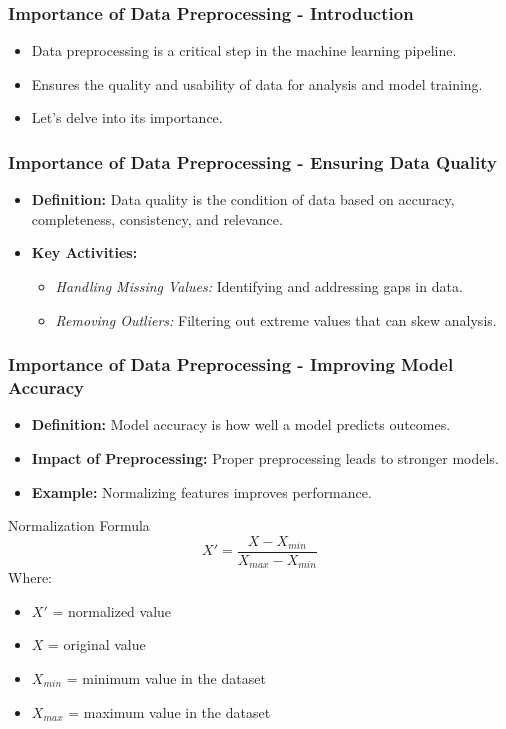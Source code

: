 \documentclass{beamer}
\begin{document}
\begin{frame}[fragile]
    \frametitle{Importance of Data Preprocessing - Introduction}
    \begin{itemize}
        \item Data preprocessing is a critical step in the machine learning pipeline.
        \item Ensures the quality and usability of data for analysis and model training.
        \item Let's delve into its importance.
    \end{itemize}
\end{frame}

\begin{frame}[fragile]
    \frametitle{Importance of Data Preprocessing - Ensuring Data Quality}
    \begin{itemize}
        \item \textbf{Definition:} Data quality is the condition of data based on accuracy, completeness, consistency, and relevance.
        \item \textbf{Key Activities:}
        \begin{itemize}
            \item \textit{Handling Missing Values:} Identifying and addressing gaps in data.
            \item \textit{Removing Outliers:} Filtering out extreme values that can skew analysis.
        \end{itemize}
    \end{itemize}
\end{frame}

\begin{frame}[fragile]
    \frametitle{Importance of Data Preprocessing - Improving Model Accuracy}
    \begin{itemize}
        \item \textbf{Definition:} Model accuracy is how well a model predicts outcomes.
        \item \textbf{Impact of Preprocessing:} Proper preprocessing leads to stronger models.
        \item \textbf{Example:} Normalizing features improves performance.
    \end{itemize}
    \begin{block}{Normalization Formula}
    \begin{equation}
        X' = \frac{X - X_{min}}{X_{max} - X_{min}}
    \end{equation}
    Where:
    \begin{itemize}
        \item \(X'\) = normalized value
        \item \(X\) = original value
        \item \(X_{min}\) = minimum value in the dataset
        \item \(X_{max}\) = maximum value in the dataset
    \end{itemize}
    \end{block}
\end{frame}
\end{document}
